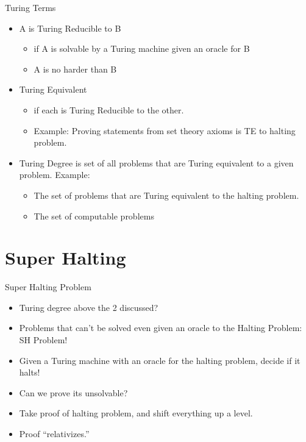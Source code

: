 \documentclass[
    11pt, %
    aspectratio=169, %
]{beamer}
\begin{document}
\begin{frame}{Turing Terms}
    \begin{itemize}
        \item A is \alert{Turing Reducible} to B 
        \begin{itemize}
            \item if A is solvable by a Turing machine given an oracle for B
            \item A is no harder than B
        \end{itemize}
        \item \alert{Turing Equivalent} 
        \begin{itemize}
            \item if each is Turing Reducible to the other.
            \item Example: Proving statements from set theory axioms is TE to halting problem.
        \end{itemize}
        \item \alert{Turing Degree} is set of all problems that are Turing equivalent to a given problem. Example:
        \begin{itemize}
            \item The set of problems that are Turing equivalent to the halting problem.
            \item The set of computable problems
            
        \end{itemize}
    \end{itemize}
\end{frame}

\section{Super Halting}
\begin{frame}{Super Halting Problem}
    \begin{itemize}
        \item Turing degree above the 2 discussed?
        \item Problems that can't be solved even given an oracle to the Halting Problem: SH Problem!
        \item Given a Turing machine with an oracle for the halting problem, decide if it halts!
        \item Can we prove its unsolvable?
        \item Take proof of halting problem, and shift everything up a level.
        \item Proof “relativizes.”
    \end{itemize}
\end{frame}
\end{document}
